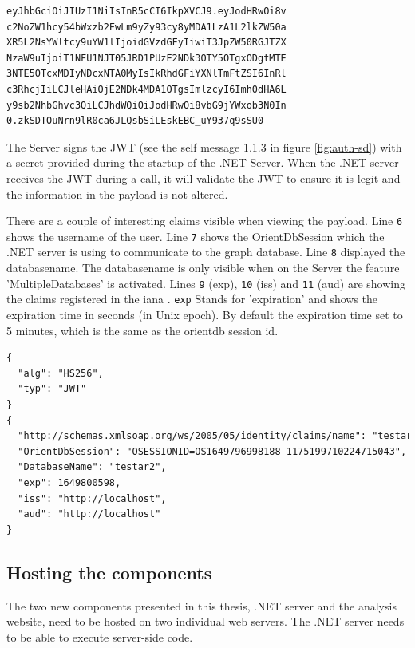 \begin{lstlisting}[language=xml, caption=Example JSON Web Token (line breaks for display purposes only), style=nonrstyle, label=code:jwt]
eyJhbGciOiJIUzI1NiIsInR5cCI6IkpXVCJ9.eyJodHRwOi8v
c2NoZW1hcy54bWxzb2FwLm9yZy93cy8yMDA1LzA1L2lkZW50a
XR5L2NsYWltcy9uYW1lIjoidGVzdGFyIiwiT3JpZW50RGJTZX
NzaW9uIjoiT1NFU1NJT05JRD1PUzE2NDk3OTY5OTgxODgtMTE
3NTE5OTcxMDIyNDcxNTA0MyIsIkRhdGFiYXNlTmFtZSI6InRl
c3RhcjIiLCJleHAiOjE2NDk4MDA1OTgsImlzcyI6Imh0dHA6L
y9sb2NhbGhvc3QiLCJhdWQiOiJodHRwOi8vbG9jYWxob3N0In
0.zkSDTOuNrn9lR0ca6JLQsbSiLEskEBC_uY937q9sSU0
\end{lstlisting}

The Server signs the JWT (see the self message 1.1.3 in figure \ref{fig:auth-sd}) with a secret provided during the startup of the .NET Server. When the .NET server receives the JWT during a call, it will validate the JWT to ensure it is legit and the information in the payload is not altered.  

There are a couple of interesting claims visible when viewing the payload. Line \verb|6| shows the username of the user. Line \verb|7| shows the OrientDbSession which the .NET server is using to communicate to the graph database. Line \verb|8| displayed the databasename. The databasename is only visible when on the Server the feature 'MultipleDatabases' is activated. Lines \verb|9| (exp), \verb|10| (iss) and \verb|11| (aud) are showing the claims registered in the \acrfull{iana} \cite{jones2015json}. \verb|exp| Stands for 'expiration' and shows the expiration time in seconds (in Unix epoch). By default the expiration time set to 5 minutes, which is the same as the orientdb session id. 

\begin{lstlisting}[language=xml, caption=Decoded JWT header and Payload of the JWT given in listing \ref{code:jwt}, label=code:jwt-payload]
{
  "alg": "HS256",
  "typ": "JWT"
}
{
  "http://schemas.xmlsoap.org/ws/2005/05/identity/claims/name": "testar",
  "OrientDbSession": "OSESSIONID=OS1649796998188-1175199710224715043",
  "DatabaseName": "testar2",
  "exp": 1649800598,
  "iss": "http://localhost",
  "aud": "http://localhost"
}
\end{lstlisting}

\subsection{Hosting the components}
The two new components presented in this thesis, .NET server and the \testar analysis website, need to be hosted on two individual web servers. The .NET server needs to be able to execute server-side code. 

